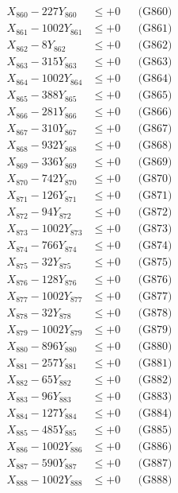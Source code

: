 \documentclass[a4paper,10pt]{article}
\begin{document}
{\begin{align}
X_{860} - 227Y_{860} &\leq +0 && \text{(G860)} \\
\allowbreak
X_{861} - 1002Y_{861} &\leq +0 && \text{(G861)} \\
X_{862} - 8Y_{862} &\leq +0 && \text{(G862)} \\
X_{863} - 315Y_{863} &\leq +0 && \text{(G863)} \\
X_{864} - 1002Y_{864} &\leq +0 && \text{(G864)} \\
X_{865} - 388Y_{865} &\leq +0 && \text{(G865)} \\
X_{866} - 281Y_{866} &\leq +0 && \text{(G866)} \\
X_{867} - 310Y_{867} &\leq +0 && \text{(G867)} \\
X_{868} - 932Y_{868} &\leq +0 && \text{(G868)} \\
X_{869} - 336Y_{869} &\leq +0 && \text{(G869)} \\
X_{870} - 742Y_{870} &\leq +0 && \text{(G870)} \\
\allowbreak
X_{871} - 126Y_{871} &\leq +0 && \text{(G871)} \\
X_{872} - 94Y_{872} &\leq +0 && \text{(G872)} \\
X_{873} - 1002Y_{873} &\leq +0 && \text{(G873)} \\
X_{874} - 766Y_{874} &\leq +0 && \text{(G874)} \\
X_{875} - 32Y_{875} &\leq +0 && \text{(G875)} \\
X_{876} - 128Y_{876} &\leq +0 && \text{(G876)} \\
X_{877} - 1002Y_{877} &\leq +0 && \text{(G877)} \\
X_{878} - 32Y_{878} &\leq +0 && \text{(G878)} \\
X_{879} - 1002Y_{879} &\leq +0 && \text{(G879)} \\
X_{880} - 896Y_{880} &\leq +0 && \text{(G880)} \\
\allowbreak
X_{881} - 257Y_{881} &\leq +0 && \text{(G881)} \\
X_{882} - 65Y_{882} &\leq +0 && \text{(G882)} \\
X_{883} - 96Y_{883} &\leq +0 && \text{(G883)} \\
X_{884} - 127Y_{884} &\leq +0 && \text{(G884)} \\
X_{885} - 485Y_{885} &\leq +0 && \text{(G885)} \\
X_{886} - 1002Y_{886} &\leq +0 && \text{(G886)} \\
X_{887} - 590Y_{887} &\leq +0 && \text{(G887)} \\
X_{888} - 1002Y_{888} &\leq +0 && \text{(G888)} \\

\end{align}}
\end{document}
